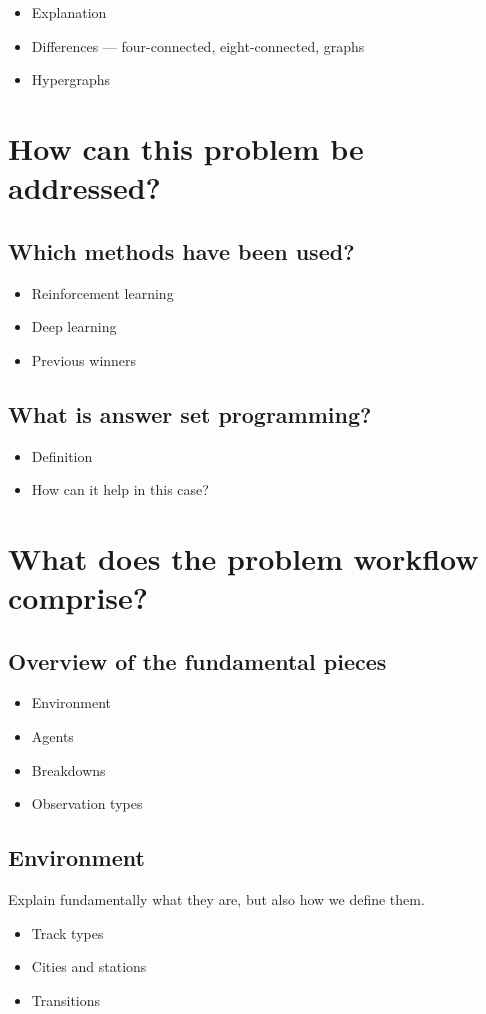 \documentclass[11pt]{article}
\begin{document}
\begin{itemize}
  \item Explanation
  \item Differences — four-connected, eight-connected, graphs
  \item Hypergraphs
\end{itemize}

\pagebreak
\section{How can this problem be addressed?}
\subsection{Which methods have been used?}
\begin{itemize}
  \item Reinforcement learning
  \item Deep learning
  \item Previous winners
\end{itemize}

\subsection{What is answer set programming?}
\begin{itemize}
  \item Definition
  \item How can it help in this case?
\end{itemize}


\pagebreak
\section{What does the problem workflow comprise?}
\subsection{Overview of the fundamental pieces}
\begin{itemize}
  \item Environment
  \item Agents
  \item Breakdowns
  \item Observation types
\end{itemize} 

\subsection{Environment}
Explain fundamentally what they are, but also how we define them.
\begin{itemize}
  \item Track types
  \item Cities and stations
  \item Transitions
\end{itemize} 
\end{document}
